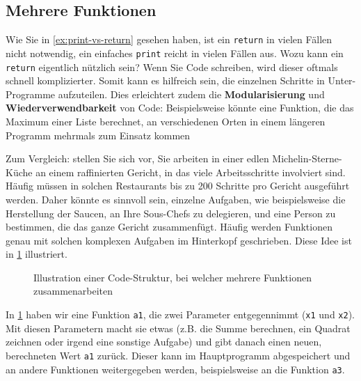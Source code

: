 \subsection{Mehrere Funktionen}
Wie Sie in \cref{ex:print-vs-return} gesehen haben, ist ein \lstinline|return| in vielen Fällen nicht notwendig, ein einfaches \lstinline|print| reicht in vielen Fällen aus. Wozu kann ein \lstinline|return| eigentlich nützlich sein? Wenn Sie Code schreiben, wird dieser oftmals schnell komplizierter. Somit kann es hilfreich sein, die einzelnen Schritte in Unter-Programme aufzuteilen. Dies erleichtert zudem die \textbf{Modularisierung} und \textbf{Wiederverwendbarkeit} von Code: Beispielsweise könnte eine Funktion, die das Maximum einer Liste berechnet, an verschiedenen Orten in einem längeren Programm mehrmals zum Einsatz kommen

Zum Vergleich: stellen Sie sich vor, Sie arbeiten in einer edlen Michelin-Sterne-Küche an einem raffinierten Gericht, in das viele Arbeitsschritte involviert sind. Häufig müssen in solchen Restaurants bis zu 200 Schritte pro Gericht ausgeführt werden. Daher könnte es sinnvoll sein, einzelne Aufgaben, wie beispielsweise die Herstellung der Saucen, an Ihre Sous-Chefs zu delegieren, und eine Person zu bestimmen, die das ganze Gericht zusammenfügt. Häufig werden Funktionen genau mit solchen komplexen Aufgaben im Hinterkopf geschrieben. Diese Idee ist in \cref{fig:funktionen-mehrere} illustriert.

\begin{figure}[H]
	\centering
	\caption{Illustration einer Code-Struktur, bei welcher mehrere Funktionen zusammenarbeiten}
	\label{fig:funktionen-mehrere}
\end{figure}

In \cref{fig:funktionen-mehrere} haben wir eine Funktion \lstinline|a1|, die zwei Parameter entgegennimmt (\lstinline|x1| und \lstinline|x2|). Mit diesen Parametern macht sie etwas (z.B. die Summe berechnen, ein Quadrat zeichnen oder irgend eine sonstige Aufgabe) und gibt danach einen neuen, berechneten Wert \lstinline|a1| zurück. Dieser kann im Hauptprogramm abgespeichert und an andere Funktionen weitergegeben werden, beispielsweise an die Funktion \lstinline|a3|.

